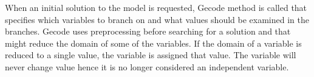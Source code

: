 When an initial solution to the model is requested, Gecode  method is called that specifies which 
variables to branch on and what values should be examined in the branches. Gecode uses preprocessing before searching 
for a solution and that might reduce the domain of some of the variables. If the domain of a variable is reduced to a 
single value, the variable is assigned that value. The variable will never change value hence it is no longer considered 
an independent variable.   